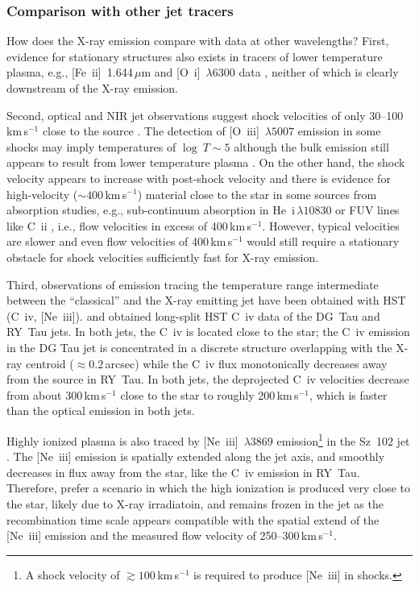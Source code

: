 \subsubsection{Comparison with other jet tracers}
How does the X-ray emission compare with data at other wavelengths? First, 
evidence for stationary structures also exists in tracers of lower temperature plasma, e.g., [Fe~{\sc ii}]~1.644\,$\mu$m  \citep{White_2014} and [O~{\sc i}]~$\lambda6300$ data \citep[][]{Schneider_2013a}, neither of which is clearly downstream of the X-ray emission. 

Second, optical and NIR jet observations suggest shock velocities of only 30--100\,km\,s$^{-1}$ close to the source \citep[e.g., ][]{Lavalley_2000, Hartigan_2007}. The detection of [O~{\sc iii}]~$\lambda5007$ emission in some shocks may imply temperatures of $\log~T\sim5$ although the bulk emission still appears to result from lower temperature plasma \citep[e.g.,][]{Bacciotti_2011,Nisini_2016}. On the other hand, the shock velocity appears to increase with post-shock velocity and there is evidence for high-velocity ($\sim400\,$km\,s$^{-1}$) material close to the star in some sources from absorption studies, e.g., sub-continuum absorption in He~{\sc i}\,$\lambda10830$ \citep[e.g.][]{Edwards_2006} or FUV lines like C~{\sc ii} \citep{Xu_2021}, i.e., flow velocities in excess of 400\,km\,s$^{-1}$. However, typical velocities are slower and even flow velocities of 400\,km\,s$^{-1}$ would still require a stationary obstacle for shock velocities sufficiently fast for X-ray emission. 

Third, observations of emission tracing the temperature range intermediate between the ``classical''  and the X-ray emitting jet have been obtained with HST (C~{\sc iv}, [Ne~{\sc iii}]). \citet{Schneider_2013a} and \citet{Skinner_2018} obtained long-split HST C~{\sc iv} data of the DG~Tau and RY~Tau  jets. In both jets, the C~{\sc iv} is located close to the star; the C~{\sc iv} emission in the DG Tau jet is concentrated in a discrete structure overlapping with the X-ray centroid ($\approx0.2$\,arcsec)  while 
the C~{\sc iv} flux monotonically decreases away from the source in RY~Tau. In both jets, the deprojected C~{\sc iv} velocities decrease from about 300\,km\,s$^{-1}$ close to the star to roughly 200\,km\,s$^{-1}$, which is faster than the optical emission in both jets.

Highly ionized plasma is also traced by [Ne~{\sc iii}]~$\lambda3869$ emission\footnote{A shock velocity of $\gtrsim100\,$km\,s$^{-1}$ is required to produce [Ne~{\sc iii}] in shocks.} in the Sz~102 jet \citep{Liu_2021}. The [Ne~{\sc iii}] emission is spatially extended along the jet axis, and smoothly decreases in flux away from the star, like the C~{\sc iv} emission in RY~Tau. Therefore, \citet{Liu_2021} prefer a scenario in which the high ionization is produced very close to the star, likely due to X-ray irradiatoin,  and remains frozen in the jet as the recombination time scale appears compatible with the spatial extend of the [Ne~{\sc iii}] emission and the measured flow velocity of 250--300\,km\,s$^{-1}$.

